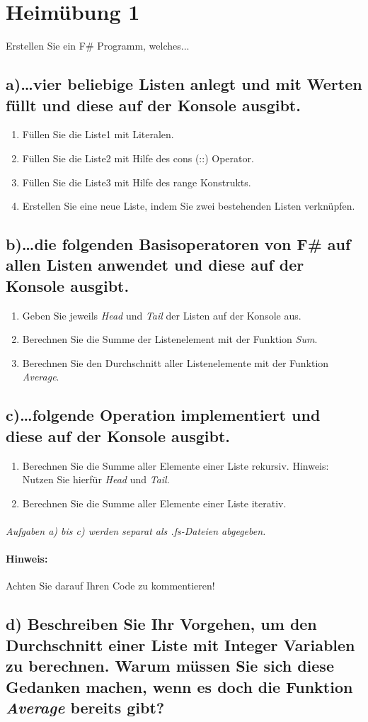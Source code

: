 \section{Heimübung 1}
Erstellen Sie ein F\# Programm, welches...
\subsection{a)\dots vier beliebige Listen anlegt und mit Werten füllt und diese auf der Konsole ausgibt.}
\begin{enumerate}
	\item Füllen Sie die Liste1 mit Literalen.
	\item Füllen Sie die Liste2 mit Hilfe des cons (::) Operator.
	\item Füllen Sie die Liste3 mit Hilfe des range Konstrukts.
	\item Erstellen Sie eine neue Liste, indem Sie zwei bestehenden Listen verknüpfen.
\end{enumerate}

\subsection{b)\dots die folgenden Basisoperatoren von F\# auf allen Listen anwendet und diese auf der Konsole ausgibt.}
\begin{enumerate}
	\item Geben Sie jeweils \textit{Head} und \textit{Tail} der Listen auf der Konsole aus.
	\item Berechnen Sie die Summe der Listenelement mit der Funktion \textit{Sum}.
	\item Berechnen Sie den Durchschnitt aller Listenelemente mit der Funktion	\textit{Average}.
\end{enumerate}

\subsection{c)\dots folgende Operation implementiert und diese auf der Konsole ausgibt.}
\begin{enumerate}
	\item Berechnen Sie die Summe aller Elemente einer Liste rekursiv. Hinweis: Nutzen Sie hierfür \textit{Head} und \textit{Tail}.
	\item Berechnen Sie die Summe aller Elemente einer Liste iterativ.
\end{enumerate}

\paragraph*{}\textit{Aufgaben a) bis c) werden separat als .fs-Dateien abgegeben.}
\paragraph*{Hinweis:}Achten Sie darauf Ihren Code zu kommentieren!

\subsection{d) Beschreiben Sie Ihr Vorgehen, um den Durchschnitt einer Liste mit Integer Variablen zu berechnen. Warum müssen Sie sich diese Gedanken machen, wenn es doch die Funktion \textit{Average} bereits gibt?} 